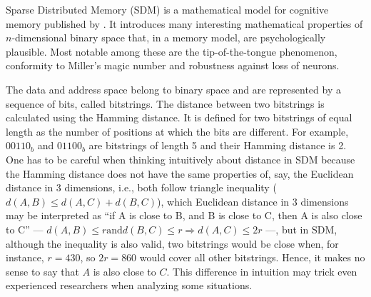 
Sparse Distributed Memory (SDM) is a mathematical model for cognitive memory published by \citet{Kanerva1988}. It introduces many interesting mathematical properties of $n$-dimensional binary space that, in a memory model, are psychologically plausible.  Most notable among these are the tip-of-the-tongue phenomenon, conformity to Miller's magic number \citep{Linhares2011} and robustness against loss of neurons.

The data and address space belong to binary space and are represented by a sequence of bits, called bitstrings. The distance between two bitstrings is calculated using the Hamming distance. It is defined for two bitstrings of equal length as the number of positions at which the bits are different. For example, $00110_{b}$ and $01100_{b}$ are bitstrings of length 5 and their Hamming distance is 2. One has to be careful when thinking intuitively about distance in SDM because the Hamming distance does not have the same properties of, say, the Euclidean distance in 3 dimensions, i.e., both follow triangle inequality ($d(A, B) \le d(A, C) + d(B, C)$), which Euclidean distance in 3 dimensions may be interpreted as ``if A is close to B, and B is close to C, then A is also close to C'' --- $d(A, B) \le r \text{and} d(B, C) \le r \Rightarrow d(A, C) \le 2r$ ---, but in SDM, although the inequality is also valid, two bitstrings would be close when, for instance, $r = 430$, so $2r = 860$ would cover all other bitstrings. Hence, it makes no sense to say that $A$ is also close to $C$. This difference in intuition may trick even experienced researchers when analyzing some situations.








